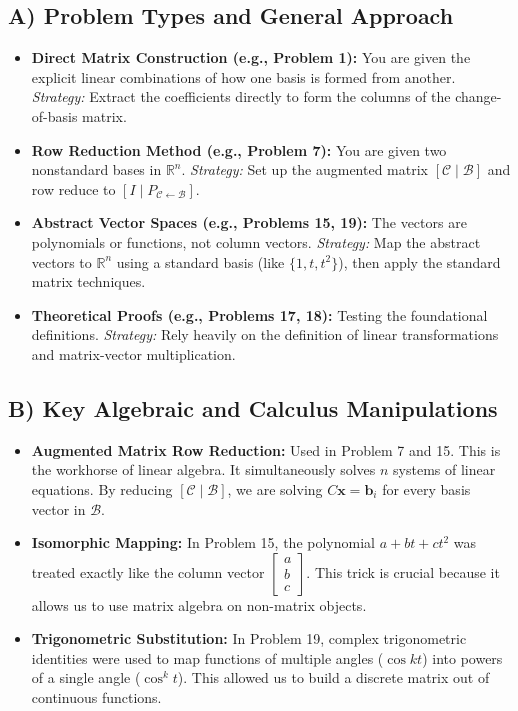 \documentclass[11pt]{article}
\begin{document}
\subsection{A) Problem Types and General Approach}
\begin{itemize}
    \item \textbf{Direct Matrix Construction (e.g., Problem 1):} You are given the explicit linear combinations of how one basis is formed from another. \textit{Strategy:} Extract the coefficients directly to form the columns of the change-of-basis matrix.
    \item \textbf{Row Reduction Method (e.g., Problem 7):} You are given two nonstandard bases in $\mathbb{R}^n$. \textit{Strategy:} Set up the augmented matrix $[ \mathcal{C} \mid \mathcal{B} ]$ and row reduce to $[ I \mid P_{\mathcal{C} \leftarrow \mathcal{B}} ]$.
    \item \textbf{Abstract Vector Spaces (e.g., Problems 15, 19):} The vectors are polynomials or functions, not column vectors. \textit{Strategy:} Map the abstract vectors to $\mathbb{R}^n$ using a standard basis (like $\{1, t, t^2\}$), then apply the standard matrix techniques.
    \item \textbf{Theoretical Proofs (e.g., Problems 17, 18):} Testing the foundational definitions. \textit{Strategy:} Rely heavily on the definition of linear transformations and matrix-vector multiplication.
\end{itemize}

\subsection{B) Key Algebraic and Calculus Manipulations}
\begin{itemize}
    \item \textbf{Augmented Matrix Row Reduction:} Used in Problem 7 and 15. This is the workhorse of linear algebra. It simultaneously solves $n$ systems of linear equations. By reducing $[ \mathcal{C} \mid \mathcal{B} ]$, we are solving $C\mathbf{x} = \mathbf{b}_i$ for every basis vector in $\mathcal{B}$.
    \item \textbf{Isomorphic Mapping:} In Problem 15, the polynomial $a + bt + ct^2$ was treated exactly like the column vector $\begin{bmatrix} a \\ b \\ c \end{bmatrix}$. This trick is crucial because it allows us to use matrix algebra on non-matrix objects.
    \item \textbf{Trigonometric Substitution:} In Problem 19, complex trigonometric identities were used to map functions of multiple angles ($\cos kt$) into powers of a single angle ($\cos^k t$). This allowed us to build a discrete matrix out of continuous functions.
\end{itemize}
\end{document}
